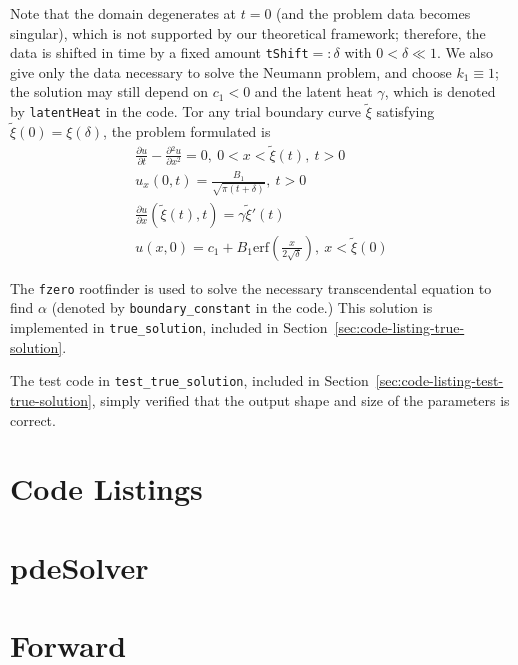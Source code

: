 \documentclass[letterpaper, 10pt, draft]{amsart}
\theoremstyle{definition}
\theoremstyle{remark}
\newcommand{\D}[2]{\frac{\partial{} #1}{\partial{} #2}}
\begin{document}
Note that the domain degenerates at $t=0$ (and the problem data becomes
singular), which is not supported by our theoretical framework; therefore, the
data is shifted in time by a fixed amount \verb+tShift+$=: \delta$ with
$0<\delta \ll 1$.
We also give only the data necessary to solve the Neumann problem, and choose
$k_1 \equiv 1$; the solution may still depend on $c_1<0$ and the latent heat
$\gamma$, which is denoted by \verb+latentHeat+ in the code.
Tor any trial boundary curve $\tilde{\xi}$ satisfying $\tilde{\xi}(0)
= \xi(\delta)$, the problem formulated is
\begin{gather}
  \D{u}{t} - \D{^2 u}{x^2} = 0,~0<x<\tilde{\xi}(t),~t>0
  \\
  u_x(0,t) = \frac{B_1}{\sqrt{\pi (t + \delta)}},~t>0
  \\
  \D{u}{x}(\tilde{\xi}(t),t) = \gamma \tilde{\xi}'(t)
  \\
  u(x,0) = c_1 + B_1 \mathrm{erf}\left( \frac{x}{2 \sqrt{\delta}}\right),~x<\tilde{\xi}(0)
\end{gather}

The \verb+fzero+ rootfinder is used to solve the necessary transcendental
equation to find $\alpha$ (denoted by \verb+boundary_constant+ in the code.)
This solution is implemented in \verb+true_solution+, included in
Section~\ref{sec:code-listing-true-solution}.

The test code in \verb+test_true_solution+, included in Section~\ref{sec:code-listing-test-true-solution}, simply verified that the output shape and size of the parameters is correct.


\appendix
\section*{Code Listings}

\section{pdeSolver}\label{sec:code-listing-pdeSolver}
{\small

}

\section{Forward}\label{sec:code-listing-forward}
{\small

}
\end{document}
